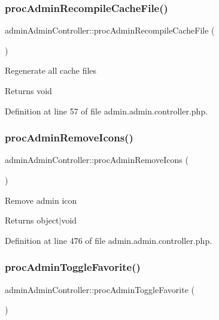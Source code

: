 \subsubsection{\texorpdfstring{proc\+Admin\+Recompile\+Cache\+File()}{procAdminRecompileCacheFile()}}
{\footnotesize\ttfamily admin\+Admin\+Controller\+::proc\+Admin\+Recompile\+Cache\+File (\begin{DoxyParamCaption}{ }\end{DoxyParamCaption})}

Regenerate all cache files \begin{DoxyReturn}{Returns}
void 
\end{DoxyReturn}


Definition at line 57 of file admin.\+admin.\+controller.\+php.

\hypertarget{classadminAdminController_a9ddaddf87c06a8ef329ddc0d4305f5d1}{}\label{classadminAdminController_a9ddaddf87c06a8ef329ddc0d4305f5d1} 
\subsubsection{\texorpdfstring{proc\+Admin\+Remove\+Icons()}{procAdminRemoveIcons()}}
{\footnotesize\ttfamily admin\+Admin\+Controller\+::proc\+Admin\+Remove\+Icons (\begin{DoxyParamCaption}{ }\end{DoxyParamCaption})}

Remove admin icon \begin{DoxyReturn}{Returns}
object$\vert$void 
\end{DoxyReturn}


Definition at line 476 of file admin.\+admin.\+controller.\+php.

\hypertarget{classadminAdminController_ab7075e4e561ebf87b4d06418638d52ab}{}\label{classadminAdminController_ab7075e4e561ebf87b4d06418638d52ab} 
\subsubsection{\texorpdfstring{proc\+Admin\+Toggle\+Favorite()}{procAdminToggleFavorite()}}
{\footnotesize\ttfamily admin\+Admin\+Controller\+::proc\+Admin\+Toggle\+Favorite (\begin{DoxyParamCaption}{ }\end{DoxyParamCaption})}

